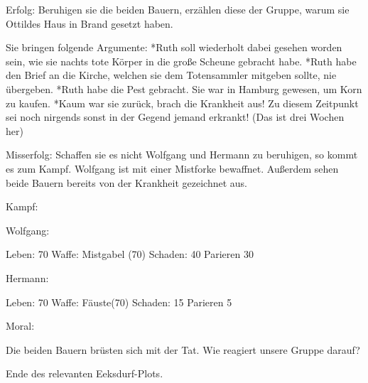 Erfolg: Beruhigen sie die beiden Bauern, erzählen diese der Gruppe, warum sie Ottildes Haus in Brand gesetzt haben.

Sie bringen folgende Argumente:
*Ruth soll wiederholt dabei gesehen worden sein, wie sie nachts tote Körper in die große Scheune gebracht habe.
*Ruth habe den Brief an die Kirche, welchen sie dem Totensammler mitgeben sollte, nie übergeben.
*Ruth habe die Pest gebracht. Sie war in Hamburg gewesen, um Korn zu kaufen.
*Kaum war sie zurück, brach die Krankheit aus! Zu diesem Zeitpunkt sei noch nirgends sonst in der Gegend jemand erkrankt! (Das ist drei Wochen her)

Misserfolg: Schaffen sie es nicht Wolfgang und Hermann zu beruhigen, so kommt es zum Kampf.
Wolfgang ist mit einer Mistforke bewaffnet. Außerdem sehen beide Bauern bereits von der Krankheit gezeichnet aus.

Kampf:

Wolfgang:

Leben: 70
Waffe: Mistgabel (70)
Schaden: 40
Parieren 30

Hermann:

Leben: 70
Waffe: Fäuste(70)
Schaden: 15
Parieren 5

Moral:

Die beiden Bauern brüsten sich mit der Tat. Wie reagiert unsere Gruppe darauf?


Ende des relevanten Eeksdurf-Plots.
